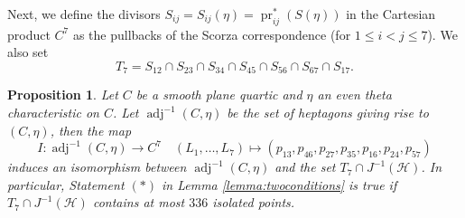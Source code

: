 \documentclass[12pt]{article}
\newtheorem{proposition}[theorem]{Proposition}
\numberwithin{equation}{section}
\theoremstyle{definition}
\DeclareMathOperator{\adj}{adj}
\DeclareMathOperator{\pr}{pr}
\begin{document}
Next, we define the divisors $S_{ij} = S_{ij}(\eta) = \pr^*_{ij}(S(\eta))$ in the Cartesian product $C^7$ as the pullbacks of the Scorza correspondence (for $1\leq i<j\leq 7$). We also set
\[ T_7 = S_{12}\cap S_{23} \cap S_{34} \cap S_{45} \cap S_{56} \cap S_{67} \cap S_{17}. \]


\begin{proposition}\label{prop:reconstructionscorza}
	Let $C$ be a smooth plane quartic and $\eta$ an even theta characteristic on $C$. Let $\adj^{-1}(C,\eta)$ be the set of heptagons giving rise to $(C,\eta)$, then the map
	\[ I\colon \adj^{-1}(C,\eta) \longrightarrow C^7 \quad (L_1,\dots,L_7) \mapsto (p_{13},p_{46},p_{27},p_{35},p_{16},p_{24},p_{57}) \]
	induces an isomorphism between $\adj^{-1}(C,\eta)$ and the set $T_7\cap J^{-1}(\mathcal{H})$.
	In particular, Statement $(*)$ in Lemma \ref{lemma:twoconditions} is true if $T_7\cap J^{-1}(\mathcal{H})$ contains at most $336$ isolated points.
\end{proposition}
\end{document}
